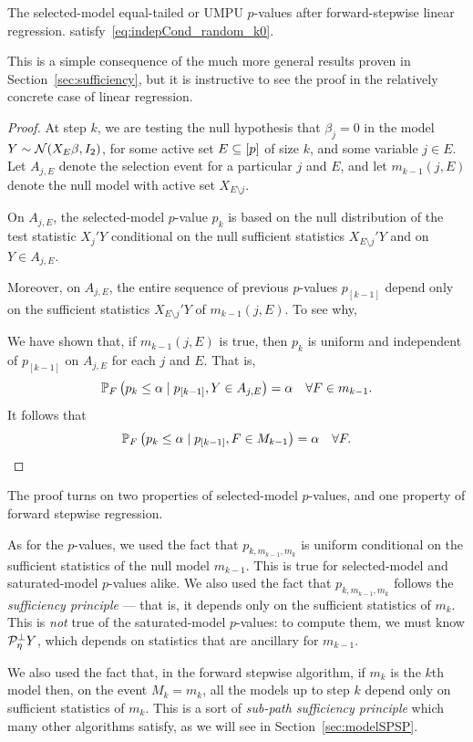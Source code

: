 \documentclass{article}
\begin{document}
\begin{proposition}
  The selected-model equal-tailed or UMPU $p$-values after forward-stepwise linear regression. satisfy~\eqref{eq:indepCond_random_k0}.
\end{proposition}
This is a simple consequence of the much more general results proven in Section~\ref{sec:sufficiency}, but it is instructive to see the proof in the relatively concrete case of linear regression.
\begin{proof}
  At step $k$, we are testing the null hypothesis that $\beta_j=0$ in     the model $Y\sim \cN(X_E\beta, I_2)$, for some active set $E\sub [p]$ of size $k$, and some variable $j\in E$. Let $A_{j,E}$ denote the selection event for a particular $j$ and $E$, and let $m_{k-1}(j,E)$ denote the null model with active set $X_{E\setminus j}$.

On $A_{j, E}$, the selected-model $p$-value $p_k$ is based on the null distribution of the test statistic $X_j'Y$ conditional on the null sufficient statistics $X_{E\setminus j}'Y$ and on $Y \in A_{j,E}$.

Moreover, on $A_{j,E}$, the entire sequence of previous $p$-values $p_{[k-1]}$ depend only on the sufficient statistics $X_{E\setminus j}'Y$ of $m_{k-1}(j,E)$. To see why, 

We have shown that, if $m_{k-1}(j,E)$ is true, then $p_k$ is uniform and independent of $p_{[k-1]}$ on $A_{j,E}$ for each $j$ and $E$. That is,
\[
\P_F\left(p_{k} \leq \alpha \mid p_{[k-1]}, Y \in A_{j,E} \right) = \alpha \quad \forall F \in m_{k-1}.
\]
It follows that 
\[
\P_F\left(p_{k} \leq \alpha \mid p_{[k-1]}, F \in M_{k-1} \right) = \alpha \quad \forall F.
\]
\end{proof}
The proof turns on two properties of selected-model $p$-values, and one property of forward stepwise regression. 

As for the $p$-values, we used the fact that $p_{k,m_{k-1},m_k}$ is uniform conditional on the sufficient statistics of the null model $m_{k-1}$. This is true for selected-model and saturated-model $p$-values alike. We also used the fact that $p_{k,m_{k-1},m_k}$ follows the {\em sufficiency principle} --- that is, it depends only on the sufficient statistics of $m_k$. This is {\em not} true of the saturated-model $p$-values: to compute them, we must know $\proj_{\eta}^\perp Y$, which depends on statistics that are ancillary for $m_{k-1}$.

We also used the fact that, in the forward stepwise algorithm, if $m_k$ is the $k$th model then, on the event $M_k=m_k$, all the models up to step $k$ depend only on sufficient statistics of $m_k$. This is a sort of {\em sub-path sufficiency principle} which many other algorithms satisfy, as we will see in Section~\ref{sec:modelSPSP}.
\end{document}
